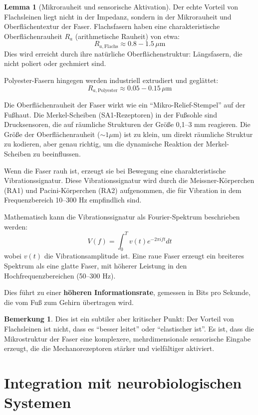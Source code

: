 \documentclass[a4paper,12pt]{article}
\theoremstyle{definition}
\newtheorem{lemma}{Lemma}
\newtheorem{bemerkung}{Bemerkung}
\begin{document}
\begin{lemma}[Mikrorauheit und sensorische Aktivation]
Der echte Vorteil von Flachsleinen liegt nicht in der Impedanz, sondern in der Mikrorauheit und Oberflächentextur der Faser. Flachsfasern haben eine charakteristische Oberflächenrauheit $R_a$ (arithmetische Rauheit) von etwa:
\[
R_{a,\text{Flachs}} \approx 0.8{-}1.5 \, \mu\text{m}
\]
Dies wird erreicht durch ihre natürliche Oberflächenstruktur: Längsfasern, die nicht poliert oder gechmiert sind.

Polyester-Fasern hingegen werden industriell extrudiert und geglättet:
\[
R_{a,\text{Polyester}} \approx 0.05{-}0.15 \, \mu\text{m}
\]

Die Oberflächenrauheit der Faser wirkt wie ein ``Mikro-Relief-Stempel'' auf der Fußhaut. Die Merkel-Scheiben (SA1-Rezeptoren) in der Fußsohle sind Drucksensoren, die auf räumliche Strukturen der Größe 0,1--3 mm reagieren. Die Größe der Oberflächenrauheit ($\sim 1 \mu$m) ist zu klein, um direkt räumliche Struktur zu kodieren, aber genau richtig, um die dynamische Reaktion der Merkel-Scheiben zu beeinflussen.

Wenn die Faser rauh ist, erzeugt sie bei Bewegung eine charakteristische Vibrationssignatur. Diese Vibrationssignatur wird durch die Meissner-Körperchen (RA1) und Pacini-Körperchen (RA2) aufgenommen, die für Vibration in dem Frequenzbereich 10--300 Hz empfindlich sind.

Mathematisch kann die Vibrationssignatur als Fourier-Spektrum beschrieben werden:
\[
V(f) = \int_0^T v(t) e^{-2\pi i f t} dt
\]
wobei $v(t)$ die Vibrationsamplitude ist. Eine raue Faser erzeugt ein breiteres Spektrum als eine glatte Faser, mit höherer Leistung in den Hochfrequenzbereichen (50--300 Hz).

Dies führt zu einer \textbf{höheren Informationsrate}, gemessen in Bits pro Sekunde, die vom Fuß zum Gehirn übertragen wird.
\end{lemma}

\begin{bemerkung}
Dies ist ein subtiler aber kritischer Punkt: Der Vorteil von Flachsleinen ist nicht, dass es ``besser leitet'' oder ``elastischer ist''. Es ist, dass die Mikrostruktur der Faser eine komplexere, mehrdimensionale sensorische Eingabe erzeugt, die die Mechanorezeptoren stärker und vielfältiger aktiviert.
\end{bemerkung}

\section{Integration mit neurobiologischen Systemen}
\end{document}
